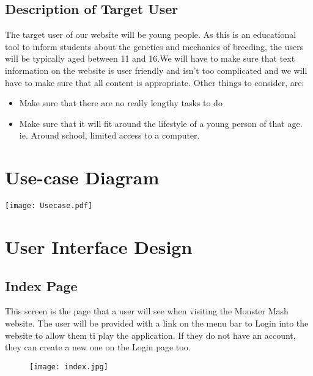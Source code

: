 \documentclass[titlepage]{article}
\begin{document}
\subsection{Description of Target User}The target user of our website will be young people. As this is an educational tool to inform students about the genetics and mechanics of breeding, the users will be typically aged between 11 and 16.We will have to make sure that text information on the website is user friendly and isn't too complicated and we will have to make sure that all content is appropriate. Other things to consider, are:
\begin{itemize}	
\item{Make sure that there are no really lengthy tasks to do}	
\item{Make sure that it will fit around the lifestyle of a young person of that age. ie. Around school, limited access to a computer.}
\end{itemize}
\newpage
\section{Use-case Diagram}
\begin{figure*}[h]
\begin{sideways}
\centering
\texttt{[image: Usecase.pdf]} 
\label{fig:Group-P Use Case}
\end{sideways}
\end{figure*}
\newpage
\section{User Interface Design}
\subsection{Index Page}
This screen is the page that a user will see when visiting the Monster Mash website. The user will be provided with a link on the menu bar to Login into the website to allow them ti play the application. If they do not have an account, they can create a new one on the Login page too.
\begin{figure}[h]
\begin{sideways}
\texttt{[image: index.jpg]}
\end{sideways}
\end{figure}
\newpage
\end{document}
